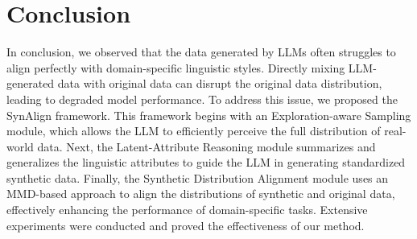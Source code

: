 \section{Conclusion}
In conclusion, we observed that the data generated by LLMs often struggles to align perfectly with domain-specific linguistic styles. Directly mixing LLM-generated data with original data can disrupt the original data distribution, leading to degraded model performance. To address this issue, we proposed the SynAlign framework. This framework begins with an Exploration-aware Sampling module, which allows the LLM to efficiently perceive the full distribution of real-world data. Next, the Latent-Attribute Reasoning module summarizes and generalizes the linguistic attributes to guide the LLM in generating standardized synthetic data. Finally, the Synthetic Distribution Alignment module uses an MMD-based approach to align the distributions of synthetic and original data, effectively enhancing the performance of domain-specific tasks. Extensive experiments were conducted and proved the effectiveness of our method.

